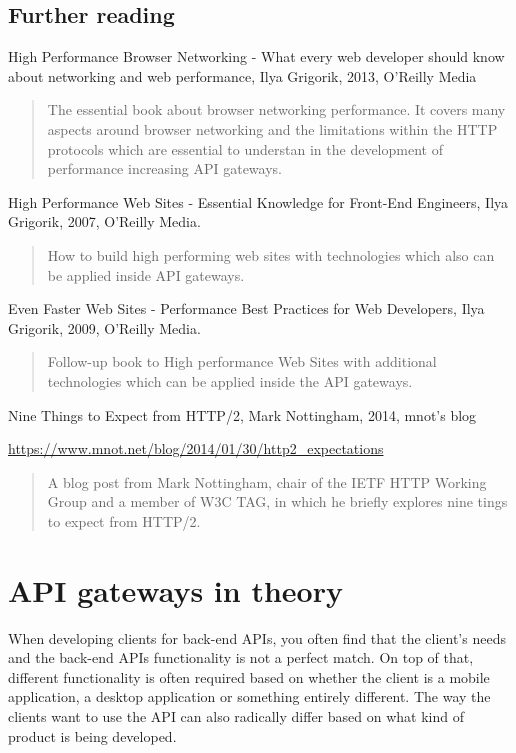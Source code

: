 \documentclass{cslthse-msc}
\begin{document}
\section{Further reading}
High Performance Browser Networking - What every web developer should know about networking and web performance, Ilya Grigorik, 2013, O'Reilly Media

\begin{quote}
	The essential book about browser networking performance. It covers many aspects around browser networking and the limitations within the HTTP protocols which are essential to understan in the development of performance increasing API gateways.
\end{quote}

\vspace{5mm}
\noindent High Performance Web Sites - Essential Knowledge for Front-End Engineers, Ilya Grigorik, 2007, O'Reilly Media.

\begin{quote}
	How to build high performing web sites with technologies which also can be applied inside API gateways.
\end{quote}

\vspace{5mm}
\noindent Even Faster Web Sites - Performance Best Practices for Web Developers, Ilya Grigorik, 2009, O'Reilly Media.

\begin{quote}
	Follow-up book to High performance Web Sites with additional technologies which can be applied inside the API gateways.
\end{quote}

\vspace{5mm}
\noindent Nine Things to Expect from HTTP/2, Mark Nottingham, 2014, mnot's blog

\noindent \url{https://www.mnot.net/blog/2014/01/30/http2_expectations}

\begin{quote}
	A blog post from Mark Nottingham, chair of the IETF HTTP Working Group and a member of W3C TAG, in which he briefly explores nine tings to expect from HTTP/2.
\end{quote}

\chapter{API gateways in theory}
When developing clients for back-end APIs, you often find that the client's needs and the back-end APIs functionality is not a perfect match. On top of that, different functionality is often required based on whether the client is a mobile application, a desktop application or something entirely different. The way the clients want to use the API can also radically differ based on what kind of product is being developed.
\end{document}
